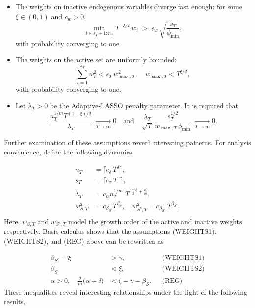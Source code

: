 \documentclass[10pt,a4paper,oneside]{article}
\begin{document}
\begin{itemize}
\begin{enumerate}
    \end{enumerate}

  \item[(WEIGHTS1)] The weights on inactive endogenous variables diverge fast enough: for some $\xi\in(0,1)$ and $c_w>0$,
  \[
    \min_{i \in s_T + 1 : n_T} T^{-\xi/2}\,w_i \;>\; c_w\,\sqrt{\frac{s_T}{\phi_{\min}}},
  \]
  with probability converging to one
  \item[(WEIGHTS2)] The weights on the active set are uniformly bounded: 
  \[
     \sum_{i=1}^{s_T} w_i^2 < s_T \,w_{\max, T}^2,\quad w_{\max, T}<T^{\xi/2},
  \]
  with probability converging to one.
\end{itemize}

\begin{itemize}
    \item[(REG)] Let $\lambda_T>0$ be the Adaptive‐LASSO penalty parameter.  It is required that
\[
   \frac{n_T^{1/m}T^{(1-\xi)/2}}{\lambda_T}\;\xrightarrow[T \to \infty]{} 0
   \quad\text{and}\quad
   \frac{\lambda_T}{\sqrt{T}}\,\frac{s_T^{1/2}}{w_{\max, T}\,\phi_{\min}}\; \xrightarrow[T \to \infty]{} 0.
\]
\end{itemize}

Further examination of these assumptions reveal interesting patterns. For analysis convenience, define the following dynamics

\begin{align*}
n_T &= \lceil c_{\delta}\,T^{\delta} \rceil, \\[6pt]
s_T &= \lceil c_{\gamma}\,T^{\gamma} \rceil, \\[6pt]
\lambda_T &= c_{\alpha} n_T^{1/m}\;T^{\frac{1-\xi}{2} + \frac{\alpha}{m}}, \\[6pt]
w_{S,T}^2 &= c_{\beta_S}\,T^{\beta_S}, 
\quad
w_{S^c,T}^2 = c_{\beta_{S^c}}\,T^{\beta_{S^c}}.
\\[4pt]
\end{align*}
Here, $w_{S,T}$ and $w_{S^c,T}$ model the growth order of the active and inactive weights respectively. Basic calculus shows that the assumptions (WEIGHTS1), (WEIGHTS2), and (REG) above can be rewritten as

\begin{align*}
\beta_{S^c} - \xi &> \gamma, 
  &&\text{(WEIGHTS1)}\\
\beta_S &< \xi, 
  &&\text{(WEIGHTS2)}\\
\alpha > 0,\quad 
\frac{2}{m}\bigl(\alpha + \delta\bigr) &< \xi - \gamma - \beta_S. 
  &&\text{(REG)}
\end{align*}
These inequalities reveal interesting relationships under the light of the following results.
\end{document}
